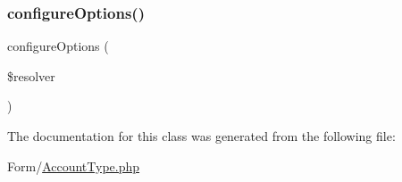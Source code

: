 \mbox{\label{class_app_1_1_form_1_1_account_type_a8ff68a86f5090b5df973286836e46ead}} 
\subsubsection{\texorpdfstring{configureOptions()}{configureOptions()}}
{\footnotesize\ttfamily configure\+Options (\begin{DoxyParamCaption}\item[{Options\+Resolver}]{\$resolver }\end{DoxyParamCaption})}



The documentation for this class was generated from the following file\+:\begin{DoxyCompactItemize}
\item 
Form/\mbox{\hyperlink{_account_type_8php}{Account\+Type.\+php}}\end{DoxyCompactItemize}
